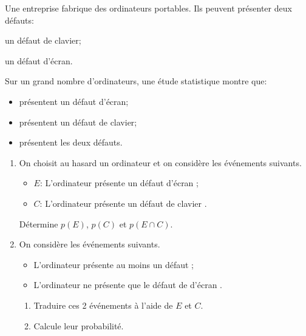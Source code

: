 \begin{exercice}
Une entreprise fabrique des ordinateurs portables. Ils peuvent présenter deux défauts:
\begin{colitemize}{2}
\item un défaut de clavier;
\item un défaut d'écran.
\end{colitemize}
 Sur un grand nombre d'ordinateurs, une étude statistique montre que:
\begin{itemize}
\item {} présentent un défaut d'écran;
\item {} présentent un défaut de clavier;
\item {} présentent les deux défauts.
\end{itemize}
\vspace{-0.75em}
\begin{enumerate}
\item On choisit au hasard un ordinateur et on considère les événements suivants.
\begin {itemize}
\item $E$: \og L'ordinateur présente un défaut d'écran \fg{};
\item $C$: \og L'ordinateur présente un défaut de clavier \fg{}.
\end{itemize} Détermine $p(E)$, $p(C)$ et $p(E \cap C)$.
\item On considère les événements suivants.
\begin{itemize}
\item \og L'ordinateur présente au moins un défaut \fg{};
\item \og L'ordinateur ne présente que le défaut de d'écran \fg{}.
\end{itemize}
\vspace{-1.5em}
\begin{enumerate}
\item Traduire ces 2  événements à l'aide de $E$ et $C$.
\item Calcule leur probabilité.
\end{enumerate}
\end{enumerate}
\end{exercice}



